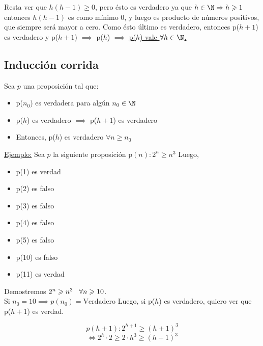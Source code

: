 \documentclass[../main.tex]{subfiles}
\begin{document}
Resta ver que $h(h-1) \geqslant 0$, pero ésto es verdadero ya que $h \in \N \Rightarrow h \geqslant 1$ entonces $h(h-1)$ es como mínimo 0, y luego es producto de números positivos, que siempre será mayor a cero. Como ésto último es verdadero, entonces p($h+1$) es verdadero y p($h+1$) $\implies$ p($h$) $\implies$ \ul{p($h$) vale $\forall h \in \N$.}


\newpage

\subsection{Inducción corrida}
Sea $p$ una proposición tal que:
\begin{itemize}
    \item p($n_0$) es verdadera para algún $n_0 \in \N$
    \item p($h$) es verdadero $\implies$ p($h+1$) es verdadero
    \item Entonces, p($h$) es verdadero $\forall n \geqslant n_0$
\end{itemize}
\nln
\ul{Ejemplo:} Sea $p$ la siguiente proposición \nln
$\text{p}(n) : 2^n \geqslant n^3$                   \nln
Luego, 

\begin{itemize}
    \item p(1) es verdad
    \item p(2) es falso
    \item p(3) es falso
    \item p(4) es falso
    \item p(5) es falso
    \item p(10) es falso
    \item p(11) es verdad
\end{itemize}

Demostremos $2^n \geqslant n^3 \hspace{3mm} \forall n \geqslant 10$.    \\
Si $n_0 = 10 \implies p(n_0) = \text{Verdadero}$                        \nln
Luego, si p($h$) es verdadero, quiero ver que p($h+1$) es verdad.

\begin{equation}
    p(h+1): 2^{h+1} \geqslant (h+1)^3
\end{equation}
\begin{equation*}
    \iff  2^{h}\cdot 2  \geqslant 2 \cdot h^3 \geq (h+1)^3
\end{equation*}
\end{document}
